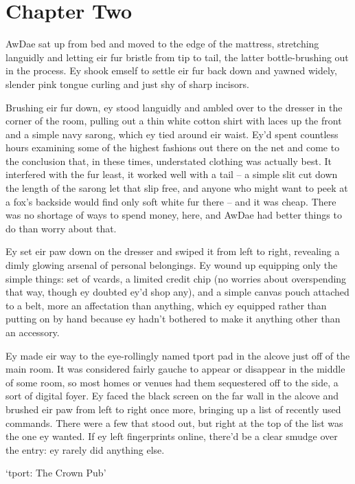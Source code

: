 \chapter*{Chapter Two}

AwDae sat up from bed and moved to the edge of the mattress, stretching languidly and letting eir fur bristle from tip to tail, the latter bottle-brushing out in the process. Ey shook emself to settle eir fur back down and yawned widely, slender pink tongue curling and just shy of sharp incisors.

Brushing eir fur down, ey stood languidly and ambled over to the dresser in the corner of the room, pulling out a thin white cotton shirt with laces up the front and a simple navy sarong, which ey tied around eir waist. Ey'd spent countless hours examining some of the highest fashions out there on the net and come to the conclusion that, in these times, understated clothing was actually best. It interfered with the fur least, it worked well with a tail -- a simple slit cut down the length of the sarong let that slip free, and anyone who might want to peek at a fox's backside would find only soft white fur there -- and it was cheap. There was no shortage of ways to spend money, here, and AwDae had better things to do than worry about that.

Ey set eir paw down on the dresser and swiped it from left to right, revealing a dimly glowing arsenal of personal belongings. Ey wound up equipping only the simple things: set of vcards, a limited credit chip (no worries about overspending that way, though ey doubted ey'd shop any), and a simple canvas pouch attached to a belt, more an affectation than anything, which ey equipped rather than putting on by hand because ey hadn't bothered to make it anything other than an accessory.

Ey made eir way to the eye-rollingly named tport pad in the alcove just off of the main room. It was considered fairly gauche to appear or disappear in the middle of some room, so most homes or venues had them sequestered off to the side, a sort of digital foyer. Ey faced the black screen on the far wall in the alcove and brushed eir paw from left to right once more, bringing up a list of recently used commands. There were a few that stood out, but right at the top of the list was the one ey wanted. If ey left fingerprints online, there'd be a clear smudge over the entry: ey rarely did anything else.

`tport: The Crown Pub'

